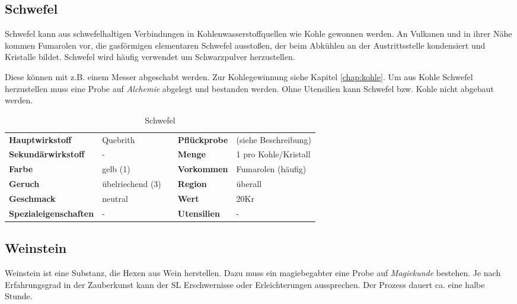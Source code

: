 \subsection{Schwefel}
\label{chap:schwefel}
Schwefel kann aus schwefelhaltigen Verbindungen in Kohlenwasserstoffquellen wie Kohle gewonnen werden. An Vulkanen und in ihrer Nähe kommen Fumarolen vor, die gasförmigen elementaren Schwefel ausstoßen, der beim Abkühlen an der Austrittsstelle kondensiert und Kristalle bildet. Schwefel wird häufig verwendet um Schwarzpulver herzustellen.

Diese können mit z.B. einem Messer abgeschabt werden. Zur Kohlegewinnung siehe Kapitel \ref{chap:kohle}. Um aus Kohle Schwefel herzustellen muss eine Probe auf \textit{Alchemie} abgelegt und bestanden werden. Ohne Utensilien kann Schwefel bzw. Kohle nicht abgebaut werden.

\begin{table}[H] 
\begin{center} 
\begin{tabular}{|l|l|p{1cm}|l|l|} 
  	\cline{1-2} \cline{4-5} 
  	\textbf{Hauptwirkstoff} & Quebrith && \textbf{Pflückprobe} & (siehe Beschreibung) \\ \cline{1-2} \cline{4-5} 
  	\textbf{Sekundärwirkstoff} & - && \textbf{Menge} & 1 pro Kohle/Kristall \\ \cline{1-2} \cline{4-5} 
  	\textbf{Farbe} & gelb (1) && \textbf{Vorkommen} & Fumarolen (häufig) \\ \cline{1-2} \cline{4-5} 
  	\textbf{Geruch} & übelriechend (3) && \textbf{Region} & überall \\ \cline{1-2} \cline{4-5} 
  	\textbf{Geschmack} & neutral && \textbf{Wert} & 20Kr \\ \cline{1-2} \cline{4-5} 
  	\textbf{Spezialeigenschaften} & - && \textbf{Utensilien} & - \\ \cline{1-2} \cline{4-5} 
\end{tabular} 
\end{center} 
\caption{Schwefel} 
\label{tab:schwefel} 
\end{table}


\subsection{Weinstein}
Weinstein ist eine Substanz, die Hexen aus Wein herstellen. Dazu muss ein magiebegabter eine Probe auf \textit{Magiekunde} bestehen. Je nach Erfahrungsgrad in der Zauberkunst kann der SL Erschwernisse oder Erleichterungen aussprechen. Der Prozess dauert ca. eine halbe Stunde.

